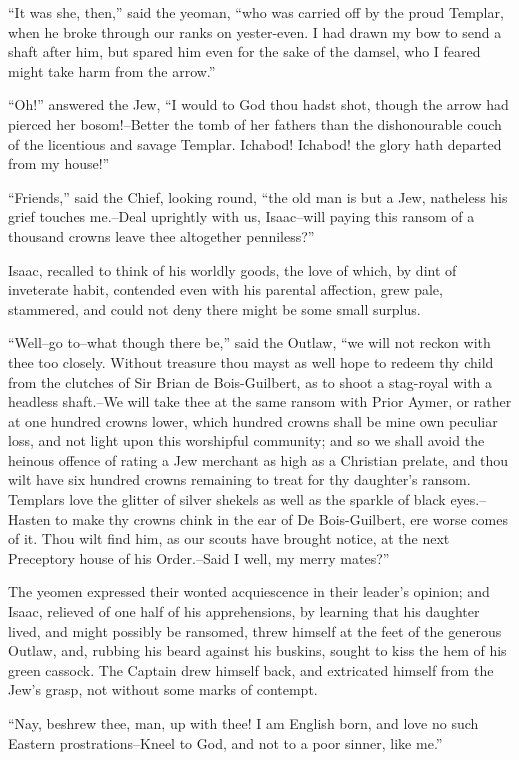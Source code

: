 ``It was she, then,'' said the yeoman, ``who was carried off by the
proud Templar, when he broke through our ranks on yester-even. I had
drawn my bow to send a shaft after him, but spared him even for the sake
of the damsel, who I feared might take harm from the arrow.''

``Oh!'' answered the Jew, ``I would to God thou hadst shot, though the
arrow had pierced her bosom!--Better the tomb of her fathers than the
dishonourable couch of the licentious and savage Templar. Ichabod!
Ichabod! the glory hath departed from my house!''

``Friends,'' said the Chief, looking round, ``the old man is but a Jew,
natheless his grief touches me.--Deal uprightly with us, Isaac--will
paying this ransom of a thousand crowns leave thee altogether
penniless?''

Isaac, recalled to think of his worldly goods, the love of which, by
dint of inveterate habit, contended even with his parental affection,
grew pale, stammered, and could not deny there might be some small
surplus.

``Well--go to--what though there be,'' said the Outlaw, ``we will not
reckon with thee too closely. Without treasure thou mayst as well hope
to redeem thy child from the clutches of Sir Brian de Bois-Guilbert, as
to shoot a stag-royal with a headless shaft.--We will take thee at the
same ransom with Prior Aymer, or rather at one hundred crowns lower,
which hundred crowns shall be mine own peculiar loss, and not light upon
this worshipful community; and so we shall avoid the heinous offence of
rating a Jew merchant as high as a Christian prelate, and thou wilt have
six hundred crowns remaining to treat for thy daughter's ransom.
Templars love the glitter of silver shekels as well as the sparkle of
black eyes.--Hasten to make thy crowns chink in the ear of De
Bois-Guilbert, ere worse comes of it. Thou wilt find him, as our scouts
have brought notice, at the next Preceptory house of his Order.--Said I
well, my merry mates?''

The yeomen expressed their wonted acquiescence in their leader's
opinion; and Isaac, relieved of one half of his apprehensions, by
learning that his daughter lived, and might possibly be ransomed, threw
himself at the feet of the generous Outlaw, and, rubbing his beard
against his buskins, sought to kiss the hem of his green cassock. The
Captain drew himself back, and extricated himself from the Jew's grasp,
not without some marks of contempt.

``Nay, beshrew thee, man, up with thee! I am English born, and love no
such Eastern prostrations--Kneel to God, and not to a poor sinner, like
me.''

